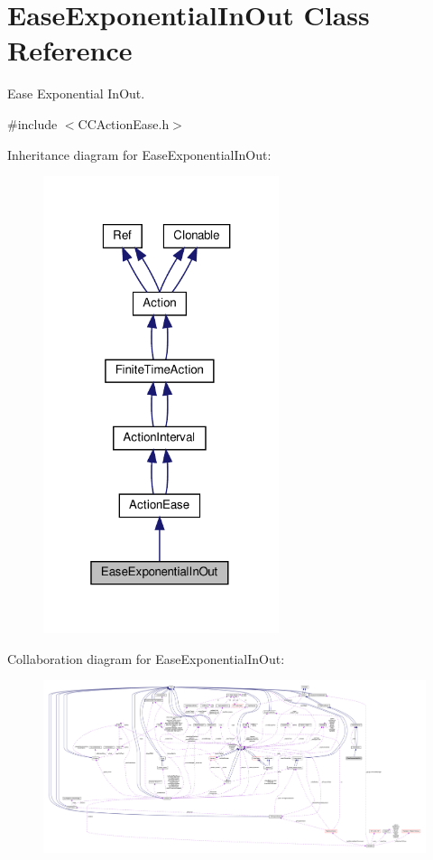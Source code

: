 \hypertarget{classEaseExponentialInOut}{}\section{Ease\+Exponential\+In\+Out Class Reference}
\label{classEaseExponentialInOut}


Ease Exponential In\+Out.  




{\ttfamily \#include $<$C\+C\+Action\+Ease.\+h$>$}



Inheritance diagram for Ease\+Exponential\+In\+Out\+:
\nopagebreak
\begin{figure}[H]
\begin{center}
\leavevmode
\includegraphics[width=196pt]{classEaseExponentialInOut__inherit__graph}
\end{center}
\end{figure}


Collaboration diagram for Ease\+Exponential\+In\+Out\+:
\nopagebreak
\begin{figure}[H]
\begin{center}
\leavevmode
\includegraphics[width=350pt]{classEaseExponentialInOut__coll__graph}
\end{center}
\end{figure}
